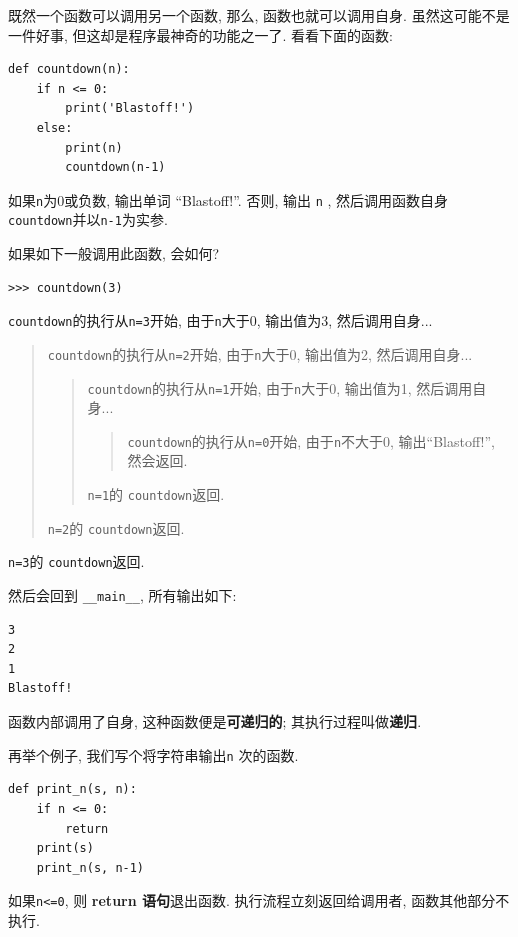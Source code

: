 \documentclass[10pt]{book}
\begin{document}
既然一个函数可以调用另一个函数, 那么, 函数也就可以调用自身. 
虽然这可能不是一件好事, 但这却是程序最神奇的功能之一了.
看看下面的函数:

\begin{verbatim}
def countdown(n):
    if n <= 0:
        print('Blastoff!')
    else:
        print(n)
        countdown(n-1)
\end{verbatim}
%
如果{\tt n}为0或负数, 输出单词 ``Blastoff!''. 
否则, 输出{ \tt n} , 然后调用函数自身{\tt countdown}并以{\tt n-1}为实参. 

如果如下一般调用此函数, 会如何?

\begin{verbatim}
>>> countdown(3)
\end{verbatim}
%

{\tt countdown}的执行从{\tt n=3}开始, 由于{\tt n}大于0, 输出值为3, 然后调用自身...

\begin{quote}
{\tt countdown}的执行从{\tt n=2}开始, 由于{\tt n}大于0, 输出值为2, 然后调用自身...

\begin{quote}
{\tt countdown}的执行从{\tt n=1}开始, 由于{\tt n}大于0, 输出值为1, 然后调用自身...

\begin{quote}
{\tt countdown}的执行从{\tt n=0}开始, 由于{\tt n}不大于0, 输出``Blastoff!'', 
然会返回. 
\end{quote}

{\tt n=1}的 {\tt countdown}返回. 
\end{quote}

{\tt n=2}的 {\tt countdown}返回. 
\end{quote}

{\tt n=3}的 {\tt countdown}返回. 

然后会回到 \verb"__main__",  所有输出如下:

\begin{verbatim}
3
2
1
Blastoff!
\end{verbatim}
%
函数内部调用了自身, 这种函数便是{\bf 可递归的};
其执行过程叫做{\bf 递归}.

再举个例子, 我们写个将字符串输出{\tt n} 次的函数.

\begin{verbatim}
def print_n(s, n):
    if n <= 0:
        return
    print(s)
    print_n(s, n-1)
\end{verbatim}
%
如果{\tt n<=0}, 则 {\bf return 语句}退出函数. 
执行流程立刻返回给调用者, 函数其他部分不执行. 
\end{document}
